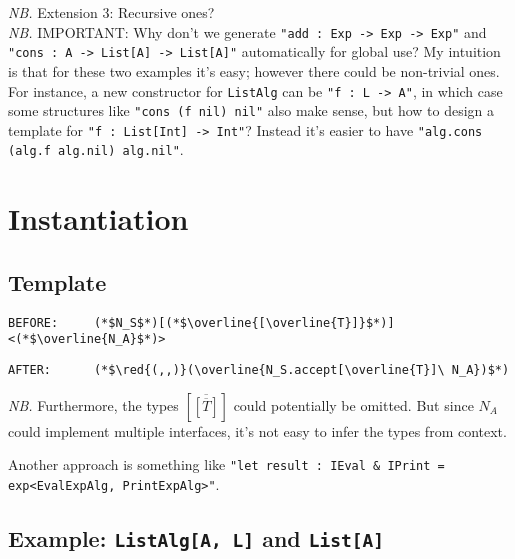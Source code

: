 \documentclass{article}
\newcommand{\red}[1]{\textcolor{red}{#1}}
\newcommand{\nb}{\textit{NB. }}
\begin{document}
\begin{spacing}{1.1}
\nb Extension 3: Recursive ones?\\

\nb IMPORTANT: Why don't we generate \lstinline{"add : Exp -> Exp -> Exp"} and \lstinline{"cons : A -> List[A] -> List[A]"} automatically for global use? My intuition is that for these two examples it's easy; however there could be non-trivial ones. For instance, a new constructor for \lstinline{ListAlg} can be \lstinline{"f : L -> A"}, in which case some structures like \lstinline{"cons (f nil)}\lstinline{ nil"} also make sense, but how to design a template for \lstinline{"f : List[Int] -> Int"}? Instead it's easier to have \lstinline{"alg.cons (alg.f alg.nil)}\lstinline{ alg.nil"}.

\section{Instantiation}

\subsection{Template}

\begin{lstlisting}[numbers=none]
BEFORE:     (*$N_S$*)[(*$\overline{[\overline{T}]}$*)]<(*$\overline{N_A}$*)>
\end{lstlisting}
\begin{lstlisting}[numbers=none]
AFTER:      (*$\red{(,,)}(\overline{N_S.accept[\overline{T}]\ N_A})$*)
\end{lstlisting}

\nb Furthermore, the types $[\overline{[\overline{T}]}]$ could potentially be omitted. But since $N_A$ could implement multiple interfaces, it's not easy to infer the types from context.

Another approach is something like \lstinline{"let result : IEval & IPrint = exp<EvalExpAlg, PrintExpAlg>"}.

\subsection{Example: \lstinline{ListAlg[A, L]} and \lstinline{List[A]}}


\end{spacing}
\end{document}
